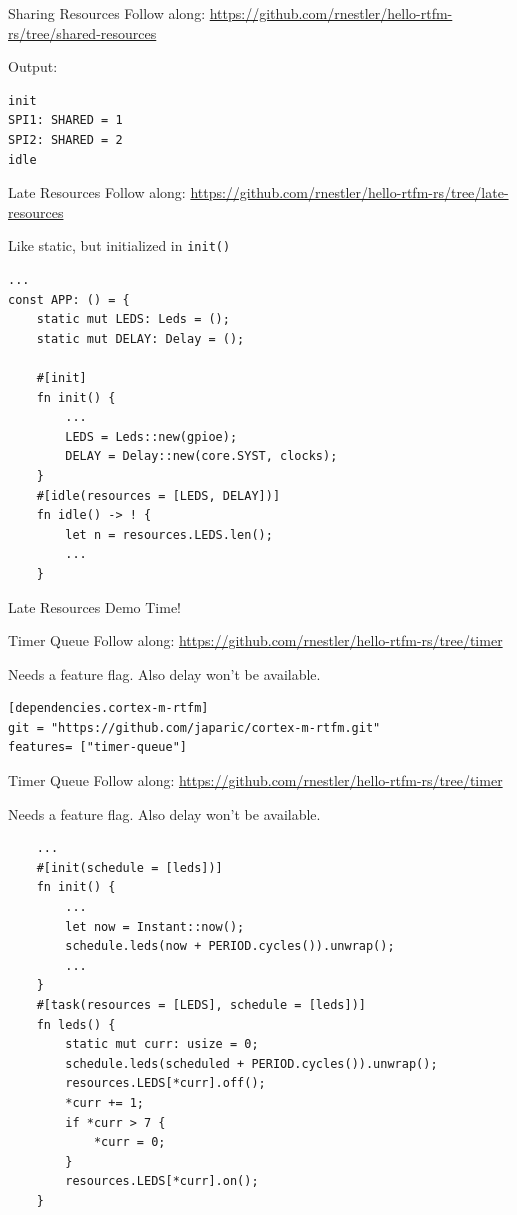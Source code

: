 \documentclass[aspectratio=1610,14pt,t]{beamer}
\begin{document}
\begin{frame}[c,fragile]{Sharing Resources}
  \small{Follow along: \url{https://github.com/rnestler/hello-rtfm-rs/tree/shared-resources}}

  Output:
  \begin{verbatim}
init
SPI1: SHARED = 1
SPI2: SHARED = 2
idle
  \end{verbatim}
\end{frame}

\begin{frame}[c,fragile]{Late Resources}
  \small{Follow along: \url{https://github.com/rnestler/hello-rtfm-rs/tree/late-resources}}

  Like static, but initialized in \texttt{init()}

  \begin{verbatim}
...
const APP: () = {
    static mut LEDS: Leds = ();
    static mut DELAY: Delay = ();

    #[init]
    fn init() {
        ...
        LEDS = Leds::new(gpioe);
        DELAY = Delay::new(core.SYST, clocks);
    }
    #[idle(resources = [LEDS, DELAY])]
    fn idle() -> ! {
        let n = resources.LEDS.len();
        ...
    }
  \end{verbatim}
\end{frame}

\begin{frame}[c,fragile]{Late Resources}
  Demo Time!
\end{frame}

\begin{frame}[c,fragile]{Timer Queue}
  \small{Follow along: \url{https://github.com/rnestler/hello-rtfm-rs/tree/timer}}

  Needs a feature flag. Also delay won't be available.

  \begin{verbatim}
[dependencies.cortex-m-rtfm]
git = "https://github.com/japaric/cortex-m-rtfm.git"
features= ["timer-queue"]
  \end{verbatim}
\end{frame}

\begin{frame}[c,fragile]{Timer Queue}
  \small{Follow along: \url{https://github.com/rnestler/hello-rtfm-rs/tree/timer}}

  Needs a feature flag. Also delay won't be available.

  \begin{verbatim}
    ...
    #[init(schedule = [leds])]
    fn init() {
        ...
        let now = Instant::now();
        schedule.leds(now + PERIOD.cycles()).unwrap();
        ...
    }
    #[task(resources = [LEDS], schedule = [leds])]
    fn leds() {
        static mut curr: usize = 0;
        schedule.leds(scheduled + PERIOD.cycles()).unwrap();
        resources.LEDS[*curr].off();
        *curr += 1;
        if *curr > 7 {
            *curr = 0;
        }
        resources.LEDS[*curr].on();
    }
  \end{verbatim}
\end{frame}
\end{document}
